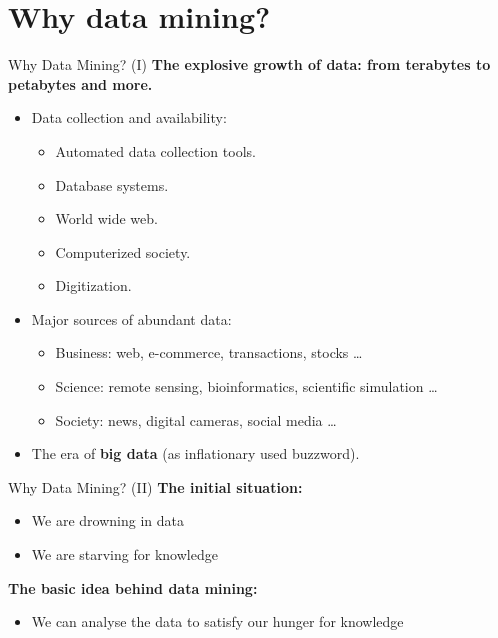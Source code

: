 \section{Why data mining?}

\begin{frame}{Why Data Mining? (I)}
	\textbf{The explosive growth of data: from terabytes to petabytes and 
	more.}\\
	\begin{itemize}
		\item Data collection and availability:
		\begin{itemize}
			\item Automated data collection tools.
			\item Database systems.
			\item World wide web.
			\item Computerized society.
			\item Digitization.
		\end{itemize}
		\item Major sources of abundant data:
		\begin{itemize}
			\item Business: web, e-commerce, transactions, stocks \ldots
			\item Science: remote sensing, bioinformatics, scientific 
			simulation \ldots
			\item Society: news, digital cameras, social media \ldots
		\end{itemize}
		\item The era of \textbf{big data} (as inflationary used buzzword).
	\end{itemize}
\end{frame}

\begin{frame}{Why Data Mining? (II)}
	\textbf{The initial situation:}
	\begin{itemize}
		\item We are drowning in  data
		\item We are starving for knowledge 
	\end{itemize}
	\textbf{The basic idea behind data mining:}
	\begin{itemize}
		\item We can analyse the data to satisfy our hunger for knowledge
	\end{itemize}
\end{frame}

